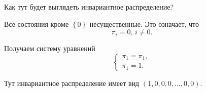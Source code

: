 \begin{enumerate}[label=\alph*)]
  Как тут будет выглядеть инвариантное распределение?

  Все состояния кроме $ \left\{ 0 \right\} $ несущественные.
  Это означает, что
  \begin{equation*}
    \pi_i = 0, \,
    i \neq 0.
  \end{equation*}

  Получаем систему уравнений
  \begin{equation*}
    \begin{cases}
      \pi_1 = \pi_1, \\
      \pi_1 = 1.
  \end{cases}
  \end{equation*}

  Тут инвариантное распределение имеет вид $ \left( 1, 0, 0, 0, \dotsc, 0, 0 \right) $.
\end{enumerate}
